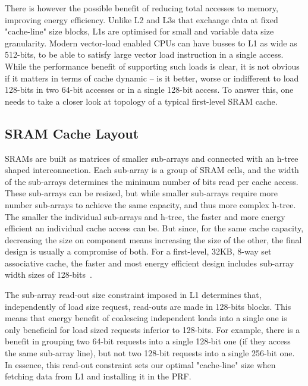 \documentclass{sig-alternate}
\begin{document}
There is however the possible benefit of reducing total accesses to memory, improving energy efficiency. Unlike L2 and L3s that exchange data at fixed "cache-line" size blocks, L1s are optimised for small and variable data size granularity. Modern vector-load enabled CPUs can have busses to L1 as wide as 512-bits, to be able to satisfy large vector load instruction in a single access. While the performance benefit of supporting such loads is clear, it is not obvious if it matters in terms of cache dynamic -- is it better, worse or indifferent to load 128-bits in two 64-bit accesses or in a single 128-bit access. To answer this, one needs to take a closer look at topology of a typical first-level SRAM cache. 



\subsection{SRAM Cache Layout}

SRAMs are built as matrices of smaller sub-arrays and connected with an h-tree shaped interconnection. Each sub-array is a group of SRAM cells, and the width of the sub-arrays determines the minimum number of bits read per cache access. These sub-arrays can be resized, but while smaller sub-arrays require more number sub-arrays to achieve the same capacity, and thus more complex h-tree. The smaller the individual sub-arrays and h-tree, the faster and more energy efficient an individual cache access can be. But since, for the same cache capacity, decreasing the size on component means increasing the size of the other, the final design is usually a compromise of both. For a first-level, 32KB, 8-way set associative cache, the faster and most energy efficient design includes sub-array width sizes of 128-bits~\cite{}.

The sub-array read-out size constraint imposed in L1 determines that, independently of load size request, read-outs are made in 128-bits blocks. This means that energy benefit of coalescing independent loads into a single one is only beneficial for load sized requests inferior to 128-bits. For example, there is a benefit in grouping two 64-bit requests into a single 128-bit one (if they access the same sub-array line), but not two 128-bit requests into a single 256-bit one. In essence, this read-out constraint sets our optimal "cache-line" size when fetching data from L1 and installing it in the PRF.
\end{document}
